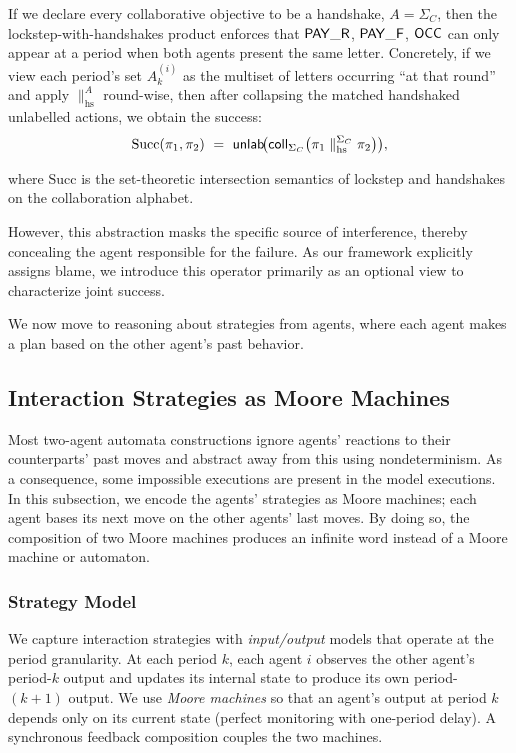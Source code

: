   \begin{remark}
  If we declare every collaborative objective to be a handshake, \(A=\Sigma_C\), then the lockstep-with-handshakes product enforces that \(\mathsf{PAY\_R}\), \(\mathsf{PAY\_F}\), \(\mathsf{OCC}\) can only appear at a period when both agents present the same letter. Concretely, if we view each period’s set
  \(A^{(i)}_k\) as the multiset of letters occurring “at that round” and apply
  \(\parallel_{\mathrm{hs}}^{A}\) round-wise, then after collapsing the matched
handshaked unlabelled actions, we obtain the success:
  \[
  \mathrm{Succ}(\pi_1,\pi_2) \ =\  \unlab\!\big(\mathsf{coll}_{\Sigma_C}\big(\pi_1\parallel_{\mathrm{hs}}^{\Sigma_C}\pi_2\big)\big),
  \]

where \(\mathrm{Succ}\) is the set-theoretic intersection semantics of
lockstep and handshakes on the collaboration alphabet.    

  \end{remark}

  However, this abstraction masks the specific source of interference, thereby concealing the agent responsible for the failure. As our framework explicitly assigns blame, we introduce this operator primarily as an optional view to characterize joint success.

  We now move to reasoning about strategies from agents, where each agent makes a plan based on the other agent's past behavior.

  \subsection{Interaction Strategies as Moore Machines}
  Most two-agent automata constructions ignore agents' reactions to their counterparts' past moves and abstract away from this using nondeterminism. As a consequence, some impossible executions are present in the model executions. In this subsection, we encode the agents' strategies as Moore machines; each agent bases its next move on the other agents' last moves. By doing so, the composition of two Moore machines produces an infinite word instead of a Moore machine or automaton.
  


  
  
  
  \subsubsection{Strategy Model}
  
  We capture interaction strategies with \emph{input/output} models that operate at the period granularity.
  At each period $k$, each agent $i$ observes the other agent's period-$k$ output and updates its
  internal state to produce its own period-$(k{+}1)$ output. We use \emph{Moore machines} so that an
  agent’s output at period $k$ depends only on its current state (perfect monitoring with one-period delay).
  A synchronous feedback composition couples the two machines.
  
